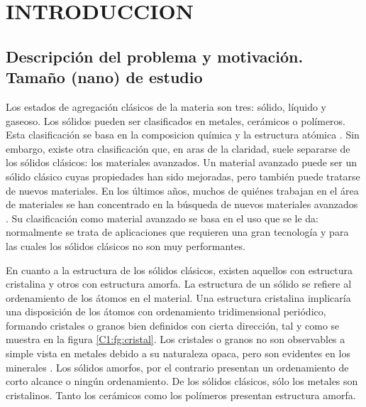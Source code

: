 
\chapter{INTRODUCCION} %

\label{C1} %



\section{Descripción del problema y motivación. Tamaño (nano) de estudio}
\label{S1_1}

Los estados de agregación clásicos de la materia son tres: sólido, líquido y gaseoso. Los sólidos pueden ser clasificados en metales, cerámicos o polímeros. Esta clasificación se basa en la composicion química y la estructura atómica \citep{callister95}. Sin embargo, existe otra clasificación que, en aras de la claridad, suele separarse de los sólidos clásicos: los materiales avanzados. Un material avanzado puede ser un sólido clásico cuyas propiedades han sido mejoradas, pero también puede tratarse de nuevos materiales. En los últimos años, muchos de quiénes trabajan en el área de materiales se han concentrado en la búsqueda de nuevos materiales avanzados \citep{suryana11}. Su clasificación como material avanzado se basa en el uso que se le da: normalmente se trata de aplicaciones que requieren una gran tecnología y para las cuales los sólidos clásicos no son muy performantes.

En cuanto a la estructura de los sólidos clásicos, existen aquellos con estructura cristalina y otros con estructura amorfa. La estructura de un sólido se refiere al ordenamiento de los átomos en el material. Una estructura cristalina implicaría una disposición de los átomos con ordenamiento tridimensional periódico, formando cristales o granos bien definidos con cierta dirección, tal y como se muestra en la figura \ref{C1:fg:cristal}. Los cristales o granos no son observables a simple vista en metales debido a su naturaleza opaca, pero son evidentes en los minerales \citep{smith96}. Los sólidos amorfos, por el contrario presentan un ordenamiento de corto alcance o ningún ordenamiento. De los sólidos clásicos, sólo los metales son cristalinos. Tanto los cerámicos como los polímeros presentan estructura amorfa.

